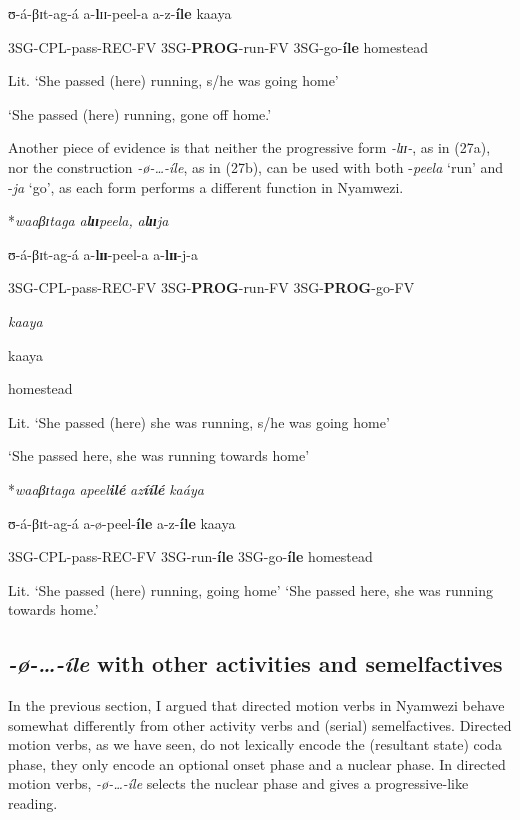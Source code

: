 \documentclass[output=paper]{langscibook}
\begin{document}
    ʊ-á-βɪt-ag-á                 a-\textbf{l}ɪɪ-peel-a            a-z-\textbf{íle}       kaaya

    3SG-CPL-pass-REC-FV 3SG-\textbf{PROG}-run-FV 3SG-go-\textbf{íle} homestead

    Lit. ‘She passed (here) running, s/he was going home’

    ‘She passed (here) running, gone off home.’
\z
\z

Another piece of evidence is that neither the progressive form \textit{-lɪɪ}\textit{-}, as in (27a), nor the construction \textit{-ø}\textit{-…-íle}, as in (27b), can be used with both -\textit{peela} ‘run’ and -\textit{ja} ‘go’, as each form performs a different function in Nyamwezi. 

\ea
\ea
*\textit{waaβɪ}\textit{taga}                    \textit{a}\textbf{\textit{l}}\textbf{\textit{ɪɪ}}\textit{peela,}               \textit{a}\textbf{\textit{l}}\textbf{\textit{ɪɪ}}\textit{ja} 

      ʊ-á-βɪt-ag-á                 a-\textbf{lɪɪ}-peel-a             a-\textbf{lɪɪ}-j-a             

      3SG-CPL-pass-REC-FV 3SG-\textbf{PROG}-run-FV 3SG-\textbf{PROG}-go-FV

      \textit{kaaya}

      kaaya 

    homestead 

   Lit. ‘She passed (here) she was running, s/he was going home’

   ‘She passed here, she was running towards home’


\ex
*\textit{waaβɪ}\textit{taga}                   \textit{apeel}\textbf{\textit{ilé}}       \textit{az}\textbf{\textit{íílé}}        \textit{kaáya}

    ʊ-á-βɪt-ag-á                a-ø-peel-\textbf{íle} a-z-\textbf{íle}       kaaya

    3SG-CPL-pass-REC-FV 3SG-run-\textbf{íle} 3SG-go-\textbf{íle} homestead 

    Lit. ‘She passed (here) running, going home’
    ‘She passed here, she was running towards home.’
\z
\z
\subsection{\textit{-}\textit{ø-…-íle} with other activities and semelfactives}

In the previous section, I argued that directed motion verbs in Nyamwezi behave somewhat differently from other activity verbs and (serial) semelfactives. Directed motion verbs, as we have seen, do not lexically encode the (resultant state) coda phase, they only encode an optional onset phase and a nuclear phase. In directed motion verbs, \textit{-ø-}\textit{…-íle} selects the nuclear phase and gives a progressive-like reading.
\end{document}
